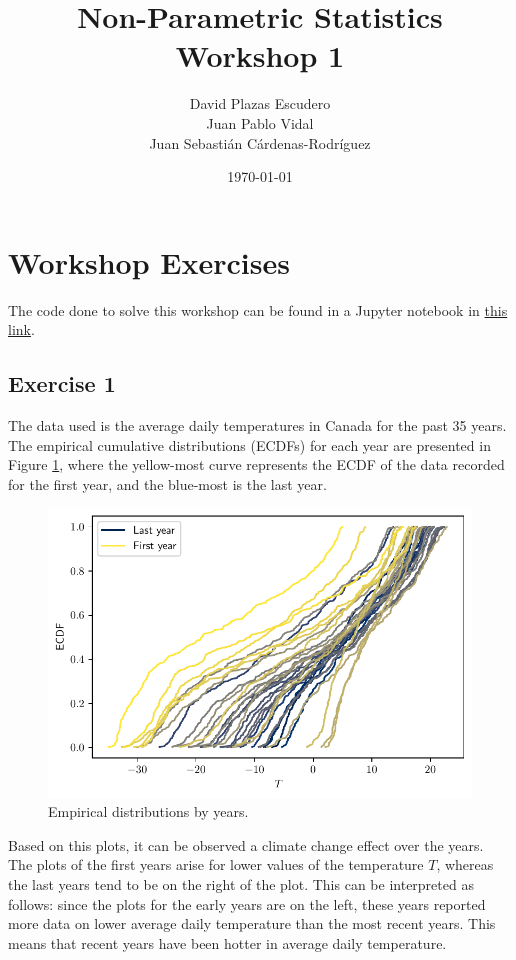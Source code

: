 \documentclass[11pt]{article}
\title{Non-Parametric Statistics Workshop 1}
\author{David Plazas Escudero \\
  Juan Pablo Vidal \\
  Juan Sebasti\'an C\'ardenas-Rodríguez \\
  \scalebox{0.7}{Mathematical Engineering, Universidad EAFIT}}
\date{\today}
\theoremstyle{definition}
\theoremstyle{remark}
\theoremstyle{remark}
\begin{document}
\maketitle
\section{Workshop Exercises}
The code done to solve this workshop can be found in a Jupyter
notebook in \href{https://bit.ly/2SNMPod}{this link}.
\subsection*{Exercise 1}
The data used is the average daily temperatures in Canada for the past
35 years. The empirical cumulative distributions (ECDFs) for each year
are presented in Figure \ref{fig:ecdfs_temps}, where the yellow-most
curve represents the ECDF of the data recorded for the first year, and
the blue-most is the last year.
\begin{figure}[H]
    \centering
    \includegraphics[scale=.5]{../figs/ecdfs.pdf}
    \caption{Empirical distributions by years.}
    \label{fig:ecdfs_temps}
\end{figure}

Based on this plots, it can be observed a climate change effect over
the years. The plots of the first years arise for lower values of the
temperature $T$, whereas the last years tend to be on the right of the
plot. This can be interpreted as follows: since the plots for the
early years are on the left, these years reported more data on lower
average daily temperature than the most recent years. This means that
recent years have been hotter in average daily temperature.
\end{document}
